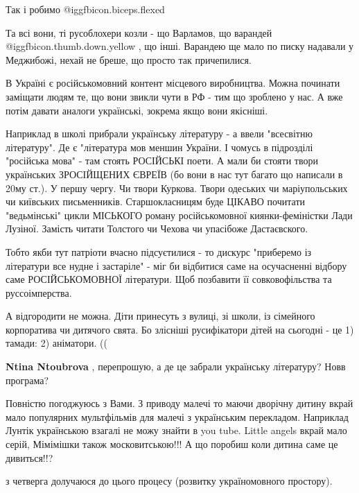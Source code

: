 \begin{itemize}
Так і робимо @igg{fbicon.biceps.flexed} 


Та всі вони, ті русоблохери козли - що Варламов, що варандей  @igg{fbicon.thumb.down.yellow}  , що інші.
Варандею ще мало по писку надавали у Меджибожі, нехай не бреше, що просто так
причепилися.


В Україні є російськомовний контент місцевого виробництва. Можна починати
заміщати людям те, що вони звикли чути в РФ - тим що зроблено у нас. А вже
потім давати аналоги українські, зокрема якщо вони якісніші.

Наприклад в школі прибрали українську літературу - а ввели "всесвітню
літературу". Де є "література мов меншин України. І чомусь в підрозділі
"російська мова" - там стоять РОСІЙСЬКІ поети. А мали би стояти твори
українських ЗРОСІЙЩЕНИХ ЄВРЕЇВ (бо вони в нас тут багато що написали в 20му
ст.). У першу чергу. Чи твори Куркова. Твори одеських чи маріупольських чи
київських письменників. Старшокласницям буде ЦІКАВО почитати "ведьмінські"
цикли МІСЬКОГО роману російськомовної киянки-феміністки Лади Лузіної. Замість
читати Толстого чи Чехова чи упасібоже Дастаєвского.

Тобто якби тут патріоти вчасно підсуєтилися - то дискурс "приберемо із
літератури все нудне і застаріле" - міг би відбитися саме на осучасненні
відбору саме РОСІЙСЬКОМОВНОЇ літератури. Щоб позбавити її совковофільства та
руссоімперства.

А відгородити не можна. Діти принесуть з вулиці, зі школи, із сімейного
корпоратива чи дитячого свята. Бо злісніші русифікатори дітей на сьогодні - це
1) тамади: 2) аніматори. ((

\begin{itemize} %
\textbf{Ntina Ntoubrova} , перепрошую, а де це забрали українську літературу? Новв програма?
\end{itemize} %

Повністю погоджуюсь з Вами.
З приводу малечі то маючи дворічну дитину вкрай мало популярних мультфільмів для малечі з українським перекладом.
Наприклад Лунтік українською взагалі не можу знайти в you tube.
Little angels вкрай мало серій,
Мімімішки також московитською!!!
А що поробиш коли дитина саме це дивиться!!?

з четверга долучаюся до цього процесу (розвитку україномовного простору).

\end{itemize} %
